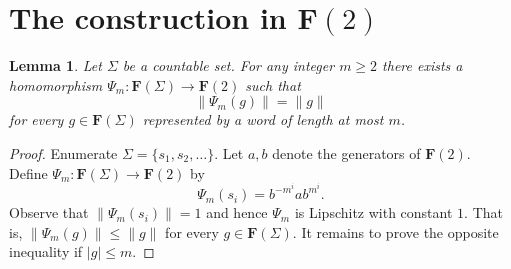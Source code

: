 \documentclass[12pt,reqno,a4paper]{article}
\newtheorem{lemma}[theorem]{Lemma}
\theoremstyle{definition}
\theoremstyle{remark}
\numberwithin{equation}{section}
\numberwithin{figure}{section}
\newcommand{\B}[1]{{\mathbf #1}}
\newcommand{\AL}[1]{\textcolor{red}{#1}}
\begin{document}
\section{The construction in $\B F(2)$}\label{SS:F2}
\begin{lemma}\label{L:transplant}
Let $\Sigma$ be a countable set.
For any integer $m\geq 2$ there exists a homomorphism $\Psi_m\colon \B F(\Sigma) \to \B F(2)$
such that
$$
\|\Psi_m(g)\| = \|g\|
$$
for every $g\in \B F(\Sigma)$ represented by a word of length at most $m$.
\end{lemma}
\begin{proof}
Enumerate $\Sigma=\{s_1,s_2,\dots\}$. %
Let $a,b$ denote the generators of $\B F(2)$.
Define $\Psi_m\colon \B F(\Sigma) \to \B F(2)$
by
\begin{equation}
\Psi_m(s_i) = b^{-m^i} a b^{m^i}.
\label{Eq:transplant}
\end{equation}
Observe that $\|\Psi_m(s_i)\| = 1$ and hence $\Psi_m$ is Lipschitz with constant
$1$. That is, $\|\Psi_m(g)\|\leq \|g\|$ for every $g\in \B F(\Sigma)$. It remains
to prove the opposite inequality if $|g| \leq m$.


\end{proof}
\end{document}
